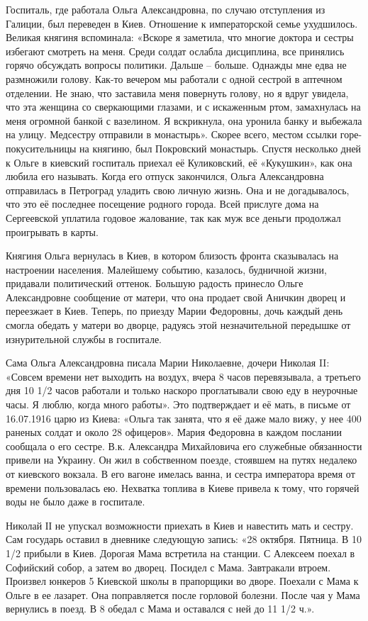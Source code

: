 Госпиталь, где работала Ольга Александровна, по случаю отступления из Галиции,
был переведен в Киев. Отношение к императорской семье ухудшилось. Великая
княгиня вспоминала: «Вскоре я заметила, что многие доктора и сестры избегают
смотреть на меня. Среди солдат ослабла дисциплина, все принялись горячо
обсуждать вопросы политики. Дальше – больше. Однажды мне едва не размножили
голову. Как-то вечером мы работали с одной сестрой в аптечном отделении. Не
знаю, что заставила меня повернуть голову, но я вдруг увидела, что эта женщина
со сверкающими глазами, и с искаженным ртом, замахнулась на меня огромной
банкой с вазелином. Я вскрикнула, она уронила банку и выбежала на улицу.
Медсестру отправили в монастырь». Скорее всего, местом ссылки
горе-покусительницы на княгиню, был Покровский монастырь. Спустя несколько дней
к Ольге в киевский госпиталь приехал её Куликовский, её «Кукушкин», как она
любила его называть. Когда его отпуск закончился, Ольга Александровна
отправилась в Петроград уладить свою личную жизнь. Она и не догадывалось, что
это её последнее посещение родного города. Всей прислуге дома на Сергеевской
уплатила годовое жалование, так как муж все деньги продолжал проигрывать в
карты.

Княгиня Ольга вернулась в Киев, в котором близость фронта сказывалась на
настроении населения. Малейшему событию, казалось, будничной жизни, придавали
политический оттенок. Большую радость принесло Ольге Александровне сообщение от
матери, что она продает свой Аничкин дворец и переезжает в Киев. Теперь, по
приезду Марии Федоровны, дочь каждый день смогла обедать у матери во дворце,
радуясь этой незначительной передышке от изнурительной службы в госпитале. 

Сама
Ольга Александровна писала Марии Николаевне, дочери Николая II: «Совсем времени
нет выходить на воздух, вчера 8 часов перевязывала, а третьего дня 10 1/2 часов
работали и только наскоро проглатывали свою еду в неурочные часы. Я люблю,
когда много работы». Это подтверждает и её мать, в письме от 16.07.1916 царю из
Киева: «Ольга так занята, что я её даже мало вижу, у нее 400 раненых солдат и
около 28 офицеров». Мария Федоровна в каждом послании сообщала о его сестре.
В.к. Александра Михайловича его служебные обязанности привели на Украину. Он
жил в собственном поезде, стоявшем на путях недалеко от киевского вокзала. В
его вагоне имелась ванна, и сестра императора время от времени пользовалась ею.
Нехватка топлива в Киеве привела к тому, что горячей воды не было даже в
госпитале.

Николай ІІ не упускал возможности приехать в Киев и навестить мать и сестру.
Сам государь оставил в дневнике следующую запись: «28 октября. Пятница. В 10
1/2 прибыли в Киев. Дорогая Мама встретила на станции. С Алексеем поехал в
Софийский собор, а затем во дворец. Посидел с Мама. Завтракали втроем. Произвел
юнкеров 5 Киевской школы в прапорщики во дворе. Поехали с Мама к Ольге в ее
лазарет. Она поправляется после горловой болезни. После чая у Мама вернулись в
поезд. В 8 обедал с Мама и оставался с ней до 11 1/2 ч.».


